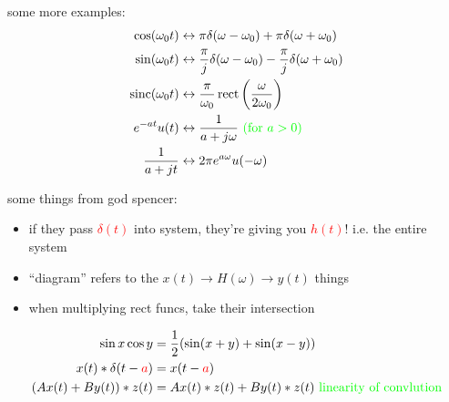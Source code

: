 \documentclass[a5paper, fleqn]{article}
\newcommand{\emf}[1]{\textcolor{red}{#1}}
\newcommand{\note}[1]{\textcolor{green}{#1}}
\newcommand{\eq}[1]{\textcolor{red}{$#1$}}
\DeclareMathOperator{\sinc}{sinc}
\DeclareMathOperator{\rect}{rect}
\begin{document}
some more examples:
\begin{align*}
  \cos(\omega_0 t)  & \leftrightarrow \pi \delta(\omega - \omega_0) + \pi \delta(\omega + \omega_0)                     \\
  \sin(\omega_0 t)  & \leftrightarrow \frac{\pi}{j} \delta(\omega - \omega_0) - \frac{\pi}{j} \delta(\omega + \omega_0) \\
  \sinc(\omega_0 t) & \leftrightarrow \frac{\pi}{\omega_0} \rect\left(\frac{\omega}{2\omega_0}\right)                   \\
  e^{-at} u(t)      & \leftrightarrow \frac{1}{a + j\omega} ~ \note{\text{(for $a > 0$)}}                               \\
  \frac{1}{a + jt}  & \leftrightarrow 2\pi e^{a\omega} u(-\omega)
\end{align*}

some things from god spencer:
\begin{itemize}
  \item if they pass \eq{\delta(t)} into system, they're giving you \eq{h(t)}! i.e. the entire system
  \item ``diagram'' refers to the $x(t) \to \boxed{H(\omega)} \to y(t)$ things
  \item when multiplying rect funcs, take their intersection
\end{itemize}
\begin{align*}
  \sin x \cos y              & = \frac{1}{2}(\sin(x + y) + \sin(x - y))                              \\
  x(t) * \delta(t - \emf{a}) & = x(t - \emf{a})                                                      \\
  (Ax(t) + By(t)) * z(t)     & = Ax(t) * z(t) + By(t) * z(t) ~ \note{\text{linearity of convlution}}
\end{align*}
\end{document}

